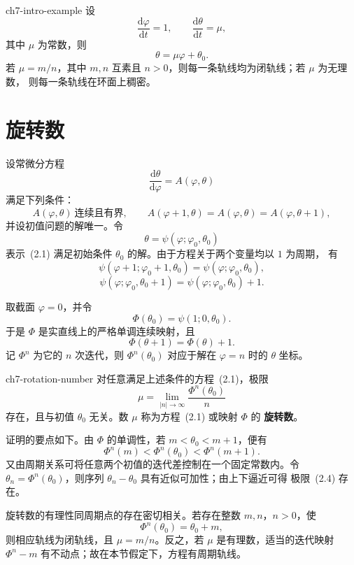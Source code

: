 \begin{example}{}{ch7-intro-example}
设
\[
  \dfrac{\mathrm d\varphi}{\mathrm dt}=1,\qquad
  \dfrac{\mathrm d\theta}{\mathrm dt}=\mu,
\]
其中 $\mu$ 为常数，则
\[
  \theta=\mu\varphi+\theta_0.
\]
若 $\mu=m/n$，其中 $m,n$ 互素且 $n>0$，则每一条轨线均为闭轨线；若 $\mu$ 为无理数，
则每一条轨线在环面上稠密。
\end{example}

\section{旋转数}

设常微分方程
\[
  \dfrac{\mathrm d\theta}{\mathrm d\varphi}=A(\varphi,\theta) \tag{2.1}
\]
满足下列条件：
\[
  A(\varphi,\theta)\ \text{连续且有界},\qquad
  A(\varphi+1,\theta)=A(\varphi,\theta)=A(\varphi,\theta+1),
\]
并设初值问题的解唯一。令
\[
  \theta=\psi(\varphi;\varphi_0,\theta_0)
\]
表示~(2.1) 满足初始条件 $\theta_0$ 的解。由于方程关于两个变量均以 $1$ 为周期，
有
\[
  \psi(\varphi+1;\varphi_0+1,\theta_0)
  =\psi(\varphi;\varphi_0,\theta_0),
\]
\[
  \psi(\varphi;\varphi_0,\theta_0+1)
  =\psi(\varphi;\varphi_0,\theta_0)+1. \tag{2.3}
\]

取截面 $\varphi=0$，并令
\[
  \Phi(\theta_0)=\psi(1;0,\theta_0). \tag{2.2}
\]
于是 $\Phi$ 是实直线上的严格单调连续映射，且
\[
  \Phi(\theta+1)=\Phi(\theta)+1.
\]
记 $\Phi^n$ 为它的 $n$ 次迭代，则 $\Phi^n(\theta_0)$ 对应于解在 $\varphi=n$ 时的
$\theta$ 坐标。

\begin{theorem}{}{ch7-rotation-number}
对任意满足上述条件的方程~(2.1)，极限
\[
  \mu=\lim_{|n|\to\infty}\dfrac{\Phi^n(\theta_0)}{n} \tag{2.4}
\]
存在，且与初值 $\theta_0$ 无关。数 $\mu$ 称为方程~(2.1) 或映射 $\Phi$ 的
\textbf{旋转数}。
\end{theorem}

证明的要点如下。由 $\Phi$ 的单调性，若 $m<\theta_0<m+1$，便有
\[
  \Phi^n(m)<\Phi^n(\theta_0)<\Phi^n(m+1).
\]
又由周期关系可将任意两个初值的迭代差控制在一个固定常数内。令
$\theta_n=\Phi^n(\theta_0)$，则序列 $\theta_n-\theta_0$ 具有近似可加性；由上下逼近可得
极限~(2.4) 存在。

旋转数的有理性同周期点的存在密切相关。若存在整数 $m,n$，$n>0$，使
\[
  \Phi^n(\theta_0)=\theta_0+m,
\]
则相应轨线为闭轨线，且 $\mu=m/n$。反之，若 $\mu$ 是有理数，适当的迭代映射
$\Phi^n-m$ 有不动点；故在本节假定下，方程有周期轨线。

